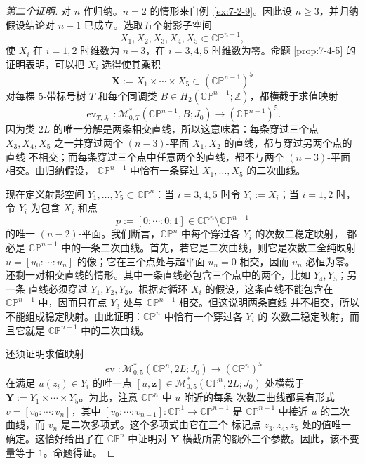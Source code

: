 \begin{proof}[第二个证明]
对 $n$ 作归纳。$n=2$ 的情形来自例~\ref{ex:7-2-9}。因此设 $n\ge3$，并归纳假设结论对
$n-1$ 已成立。选取五个射影子空间
\[
  X_1,X_2,X_3,X_4,X_5\subset\mathbb{CP}^{n-1},
\]
使 $X_i$ 在 $i=1,2$ 时维数为 $n-3$，在 $i=3,4,5$ 时维数为零。命题
\ref{prop:7-4-5} 的证明表明，可以把 $X_i$ 选得使其乘积
\[
  \mathbf X:=X_1\times\cdots\times X_5
  \subset(\mathbb{CP}^{n-1})^5
\]
对每棵 $5$-带标号树 $T$ 和每个同调类
$B\in H_2(\mathbb{CP}^{n-1};\mathbb Z)$，都横截于求值映射
\[
  \operatorname{ev}_{T,J_0}:
  \mathcal M^*_{0,T}(\mathbb{CP}^{n-1},B;J_0)
  \longrightarrow(\mathbb{CP}^{n-1})^5.
\]
因为类 $2L$ 的唯一分解是两条相交直线，所以这意味着：每条穿过三个点
$X_3,X_4,X_5$ 之一并穿过两个 $(n-3)$-平面 $X_1,X_2$ 的直线，都与穿过另两个点的直线
不相交；而每条穿过三个点中任意两个的直线，都不与两个 $(n-3)$-平面相交。由归纳假设，
$\mathbb{CP}^{n-1}$ 中恰有一条穿过 $X_1,\ldots,X_5$ 的二次曲线。

现在定义射影空间 $Y_1,\ldots,Y_5\subset\mathbb{CP}^n$：当 $i=3,4,5$ 时令
$Y_i:=X_i$；当 $i=1,2$ 时，令 $Y_i$ 为包含 $X_i$ 和点
\[
  p:=[0:\cdots:0:1]\in\mathbb{CP}^n\setminus\mathbb{CP}^{n-1}
\]
的唯一 $(n-2)$-平面。我们断言，$\mathbb{CP}^n$ 中每个穿过各 $Y_i$ 的次数二稳定映射，
都必是 $\mathbb{CP}^{n-1}$ 中的一条二次曲线。首先，若它是二次曲线，则它是次数二全纯映射
$u=[u_0:\cdots:u_n]$ 的像；它在三个点处与超平面 $u_n=0$ 相交，因而 $u_n$ 必恒为零。
还剩一对相交直线的情形。其中一条直线必包含三个点中的两个，比如 $Y_4,Y_5$；另一条
直线必须穿过 $Y_1,Y_2,Y_3$。根据对循环 $X_i$ 的假设，这条直线不能包含在
$\mathbb{CP}^{n-1}$ 中，因而只在点 $Y_3$ 处与 $\mathbb{CP}^{n-1}$ 相交。但这说明两条直线
并不相交，所以不能组成稳定映射。由此证明：$\mathbb{CP}^n$ 中恰有一个穿过各 $Y_i$ 的
次数二稳定映射，而且它就是 $\mathbb{CP}^{n-1}$ 中的二次曲线。

还须证明求值映射
\[
  \operatorname{ev}:
  \mathcal M^*_{0,5}(\mathbb{CP}^n,2L;J_0)
  \longrightarrow(\mathbb{CP}^n)^5
\]
在满足 $u(z_i)\in Y_i$ 的唯一点
$[u,\mathbf z]\in\mathcal M^*_{0,5}(\mathbb{CP}^n,2L;J_0)$ 处横截于
$\mathbf Y:=Y_1\times\cdots\times Y_5$。为此，注意 $\mathbb{CP}^n$ 中 $u$ 附近的每条
次数二曲线都具有形式 $v=[v_0:\cdots:v_n]$，其中
$[v_0:\cdots:v_{n-1}]:\mathbb{CP}^1\to\mathbb{CP}^{n-1}$ 是
$\mathbb{CP}^{n-1}$ 中接近 $u$ 的二次曲线，而 $v_n$ 是二次多项式。这个多项式由它在三个
标记点 $z_3,z_4,z_5$ 处的值唯一确定。这恰好给出了在 $\mathbb{CP}^n$ 中证明对
$\mathbf Y$ 横截所需的额外三个参数。因此，该不变量等于 $1$。命题得证。
\end{proof}

